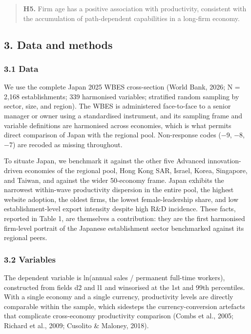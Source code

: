 \documentclass[
  12pt,a4paper]{article}
\begin{document}
\begin{quote}
\textbf{H5.} Firm age has a positive association with productivity,
consistent with the accumulation of path-dependent capabilities in a
long-firm economy.
\end{quote}

\hypertarget{data-and-methods}{%
\subsection{3. Data and methods}\label{data-and-methods}}

\hypertarget{data}{%
\subsubsection{3.1 Data}\label{data}}

We use the complete Japan 2025 WBES cross-section (World Bank, 2026; N =
2,168 establishments; 339 harmonised variables; stratified random
sampling by sector, size, and region). The WBES is administered
face-to-face to a senior manager or owner using a standardised
instrument, and its sampling frame and variable definitions are
harmonised across economies, which is what permits direct comparison of
Japan with the regional pool. Non-response codes (−9, −8, −7) are
recoded as missing throughout.

To situate Japan, we benchmark it against the other five Advanced
innovation-driven economies of the regional pool, Hong Kong SAR, Israel,
Korea, Singapore, and Taiwan, and against the wider 50-economy frame.
Japan exhibits the narrowest within-wave productivity dispersion in the
entire pool, the highest website adoption, the oldest firms, the lowest
female-leadership share, and low establishment-level export intensity
despite high R\&D incidence. These facts, reported in Table 1, are
themselves a contribution: they are the first harmonised firm-level
portrait of the Japanese establishment sector benchmarked against its
regional peers.

\hypertarget{variables}{%
\subsubsection{3.2 Variables}\label{variables}}

The dependent variable is ln(annual sales / permanent full-time
workers), constructed from fields d2 and l1 and winsorised at the 1st
and 99th percentiles. With a single economy and a single currency,
productivity levels are directly comparable within the sample, which
sidesteps the currency-conversion artefacts that complicate
cross-economy productivity comparison (Combs et al., 2005; Richard et
al., 2009; Cusolito \& Maloney, 2018).
\end{document}
